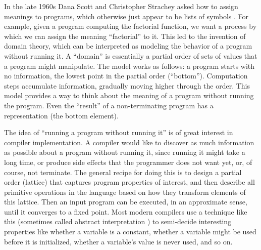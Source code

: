 In the late 1960s Dana Scott and Christopher Strachey asked how to assign
meanings to programs, which otherwise just appear to be lists of symbols
\cite{scott1971toward}.
For example, given a program computing the factorial function, we
want a process by which we can assign the meaning ``factorial'' to it.
This led to the invention of domain theory, which can be interpreted
as modeling the behavior of a program without running it.
A ``domain'' is essentially a partial order of sets of values that a
program might manipulate.
The model works as follows: a program starts with no
information, the lowest point in the partial order (``bottom'').
Computation steps accumulate information, gradually moving higher through
the order.
This model provides a way to think about the meaning of a program without
running the program.
Even the ``result'' of a non-terminating program has a representation
(the bottom element).

The idea of ``running a program without running it'' is of great interest
in compiler implementation.
A compiler would like to discover as much information as possible about a
program without running it, since running it might take a long time, or
produce side effects that the programmer does not want yet, or, of course,
not terminate.
The general recipe for doing this is to design a partial order (lattice)
that captures program properties of interest, and then describe all
primitive operations in the language based on how they transform
elements of this lattice.
Then an input program can be executed, in an approximate sense, until
it converges to a fixed point.
Most modern compilers use a technique like this
(sometimes called abstract interpretation \cite{abstractinterp})
to semi-decide
interesting properties like whether a variable is a constant, whether
a variable might be used before it is initialized, whether a variable's
value is never used, and so on.

